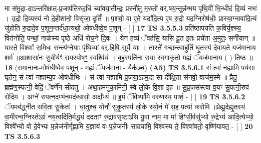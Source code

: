 \documentclass[17pt]{extarticle}
\begin{document}
                  मा स॑मु॒द्रा-दाऽन्तरि॑क्षात्-प्र॒जाप॑तिरुद॒धिं च्या॑वया॒तीन्द्रः॒ प्रस्नौ॑तु म॒रुतो॑ वर्.षय॒न्तून्न॑म्भय पृथि॒वीं भि॒न्धीदं दि॒व्यं नभः॑ । उ॒द्रो दि॒व्यस्य॑ नो दे॒हीशा॑नो॒ विसृ॑जा॒ दृतिं᳚ ॥ प॒शवो॒ वा ए॒ते यदा॑दि॒त्य ए॒ष रु॒द्रो यद॒ग्निरोष॑धीः॒ प्रास्या॒ग्नावा॑दि॒त्यं जु॑होति रु॒द्रादे॒व प॒शून॒न्तर्द॑धा॒त्यथो॒ ओष॑धीष्वे॒व प॒शून् - [  ] \textbf{  17} \newline
                  \newline
                                \textbf{ TS 3.5.5.3} \newline
                  प्रति॑ष्ठापयति क॒विर्य॒ज्ञ्स्य॒ वित॑नोति॒ पन्थां॒ नाक॑स्य पृ॒ष्ठे अधि॑ रोच॒ने दि॒वः । येन॑ ह॒व्यं ॅवह॑सि॒ यासि॑ दू॒त इ॒तः प्रचे॑ता अ॒मुतः॒ सनी॑यान् ॥ यास्ते॒ विश्वाः᳚ स॒मिधः॒ सन्त्य॑ग्ने॒याः पृ॑थि॒व्यां ब॒र्॒.हिषि॒ सूर्ये॒ याः । तास्ते॑ गच्छ॒न्त्वाहु॑तिं घृ॒तस्य॑ देवाय॒ते यज॑मानाय॒ शर्म॑ ॥आ॒शासा॑नः सु॒वीर्यꣳ॑ रा॒यस्पोषꣳ॒॒ स्वश्वि॑यं । बृह॒स्पति॑ना रा॒या स्व॒गाकृ॑तो॒ मह्यं॒ ॅयज॑मानाय ( ) तिष्ठ ॥ \textbf{  18} \newline
                  \newline
                      (स॒मा॒नाना॒-मोष॑धीष्वे॒व प॒शून् - मह्यं॒ ॅयज॑माना॒ - यैक॑ञ्च)  \textbf{(A5)} \newline \newline
                                        \textbf{ TS 3.5.6.1} \newline
                  सं त्वा॑ नह्यामि॒ पय॑सा घृ॒तेन॒ सं त्वा॑ नह्याम्य॒प ओष॑धीभिः । सं त्वा॑ नह्यामि प्र॒जया॒ऽहम॒द्य सा दी᳚क्षि॒ता स॑नवो॒ वाज॑म॒स्मे ॥ प्रैतु॒ ब्रह्म॑ण॒स्पत्नी॒ वेदिं॒ ॅवर्णे॑न सीदतु । अथा॒हम॑नुका॒मिनी॒ स्वे लो॒के वि॒शा इ॒ह ॥ सु॒प्र॒जस॑स्त्वा व॒यꣳ सु॒पत्नी॒रुप॑ सेदिम । अग्ने॑ सपत्न॒दम्भ॑न॒मद॑ब्धासो॒ अदा᳚भ्यं ॥ इ॒मं ॅविष्या॑मि॒ वरु॑णस्य॒ पाशं॒ - [  ] \textbf{  19} \newline
                  \newline
                                \textbf{ TS 3.5.6.2} \newline
                  ॅयमब॑द्ध्नीत सवि॒ता सु॒केतः॑ । धा॒तुश्च॒ योनौ॑ सुकृ॒तस्य॑ लो॒के स्यो॒नं मे॑ स॒ह पत्या॑ करोमि ॥प्रेह्यु॒देह्यृ॒तस्य॑ वा॒मीरन्व॒ग्निस्तेऽग्रं॑ नय॒त्वदि॑ति॒र्मद्ध्यं॑ ददताꣳ रु॒द्राव॑सृष्टाऽसि यु॒वा नाम॒ मा मा॑ हिꣳसी॒र्वसु॑भ्यो रु॒द्रेभ्य॑ आदि॒त्येभ्यो॒ विश्वे᳚भ्यो वो दे॒वेभ्यः॑ प॒न्नेज॑नीर्गृह्णामि य॒ज्ञाय॑ वः प॒न्नेज॑नीः सादयामि॒ विश्व॑स्य ते॒ विश्वा॑वतो॒ वृष्णि॑यावत॒ - [  ] \textbf{  20} \newline
                  \newline
                                \textbf{ TS 3.5.6.3} \newline
\end{document}
